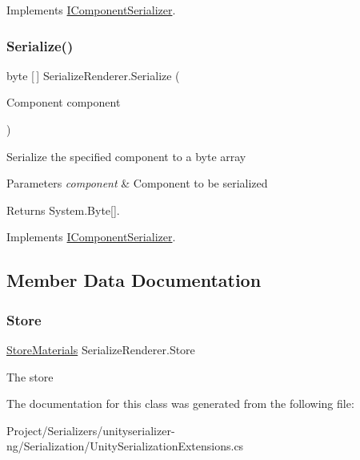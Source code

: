 Implements \hyperlink{interface_i_component_serializer_a4cc366a5c78b33d47a90c209d8fed883}{I\+Component\+Serializer}.

\mbox{\label{class_serialize_renderer_afa879a8743291c478d35c50d9956c707}} 
\subsubsection{\texorpdfstring{Serialize()}{Serialize()}}
{\footnotesize\ttfamily byte \mbox{[}$\,$\mbox{]} Serialize\+Renderer.\+Serialize (\begin{DoxyParamCaption}\item[{Component}]{component }\end{DoxyParamCaption})\hspace{0.3cm}{\ttfamily [inline]}}



Serialize the specified component to a byte array 


\begin{DoxyParams}{Parameters}
{\em component} & Component to be serialized\\
\hline
\end{DoxyParams}
\begin{DoxyReturn}{Returns}
System.\+Byte\mbox{[}\mbox{]}.
\end{DoxyReturn}


Implements \hyperlink{interface_i_component_serializer_ab2aa38005665496b62d6c54b5f0dbd31}{I\+Component\+Serializer}.



\subsection{Member Data Documentation}
\mbox{\label{class_serialize_renderer_a764f2c274eae672b01d2c22554053dc1}} 
\subsubsection{\texorpdfstring{Store}{Store}}
{\footnotesize\ttfamily \hyperlink{class_serialization_1_1_store_materials}{Store\+Materials} Serialize\+Renderer.\+Store\hspace{0.3cm}{\ttfamily [static]}}



The store 



The documentation for this class was generated from the following file\+:\begin{DoxyCompactItemize}
\item 
Project/\+Serializers/unityserializer-\/ng/\+Serialization/Unity\+Serialization\+Extensions.\+cs\end{DoxyCompactItemize}
